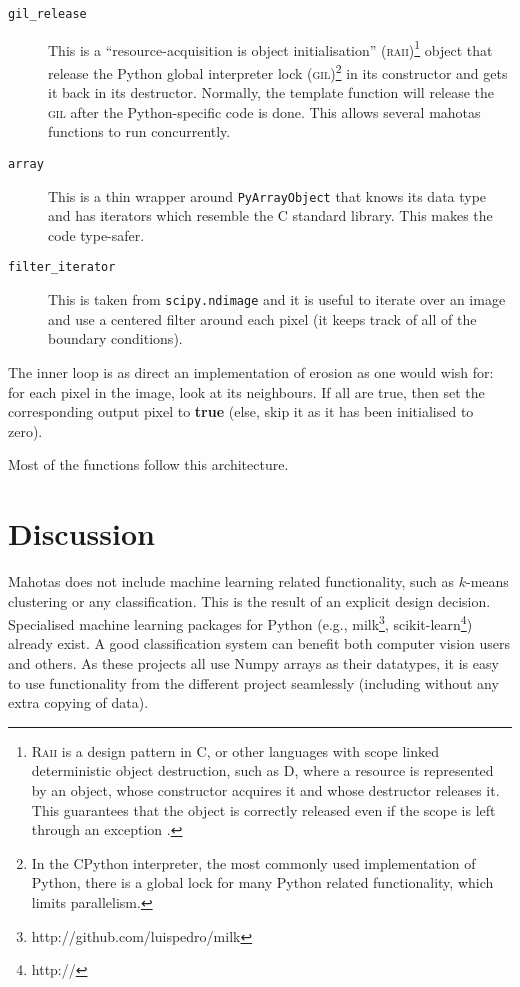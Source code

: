 \documentclass{article}
\newcommand*{\cpp}{{C\nolinebreak[4]\hspace{-.05em}\raisebox{.4ex}{\tiny\textbf{++}}}}
\let\code\texttt
\begin{document}
\begin{description}
\item[\code{gil\_release}] This is a ``resource-acquisition is object
initialisation'' (\textsc{raii})\footnote{\textsc{Raii} is a design pattern in
\cpp{}, or other languages with scope linked deterministic object destruction,
such as D, where a resource is represented by an object, whose constructor
acquires it and whose destructor releases it. This guarantees that the object
is correctly released even if the scope is left through an exception
\citep{Stroustrup1994}.} object that release the Python global interpreter lock
(\textsc{gil})\footnote{In the CPython interpreter, the most commonly used
implementation of Python, there is a global lock for many Python related
functionality, which limits parallelism.} in its constructor and gets it back
in its destructor. Normally, the template function will release the
\textsc{gil} after the Python-specific code is done. This allows several
mahotas functions to run concurrently.
\item[\code{array}] This is a thin wrapper around \code{PyArrayObject} that
knows its data type and has iterators which resemble the \cpp{} standard
library. This makes the code type-safer.
\item[\code{filter\_iterator}] This is taken from \code{scipy.ndimage} and it
is useful to iterate over an image and use a centered filter around each pixel
(it keeps track of all of the boundary conditions).
\end{description}

The inner loop is as direct an implementation of erosion as one would wish for:
for each pixel in the image, look at its neighbours. If all are true, then set
the corresponding output pixel to \textbf{true} (else, skip it as it has been
initialised to zero).

Most of the functions follow this architecture.

\section{Discussion}

Mahotas does not include machine learning related functionality, such as
$k$-means clustering or any classification. This is the result of an explicit
design decision. Specialised machine learning packages for Python (e.g.,
milk\footnote{http://github.com/luispedro/milk},
scikit-learn\footnote{http://}) already exist. A good classification system can
benefit both computer vision users and others. As these projects all use Numpy
arrays as their datatypes, it is easy to use functionality from the different
project seamlessly (including without any extra copying of data).
\end{document}
